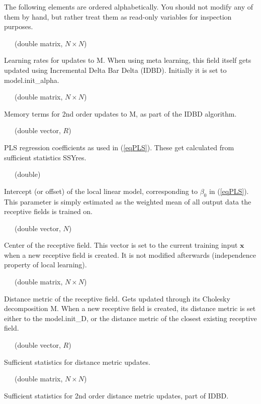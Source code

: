 \documentclass[11pt,a4paper]{article}
\newcommand{\mbf}{\mathbf}
\newenvironment{element}[2]%
{{\large\sf #1}~~~(#2)\begin{list}{}%
{\setlength{\leftmargin}{0.5cm}\setlength{\topsep}{0.2cm}}%
\item[]%
}
{\end{list}}
\begin{document}
The following elements are ordered alphabetically. You should not
modify any of them by hand, but rather treat them as read-only variables
for inspection purposes.\medskip

\begin{element}{alpha}{double matrix, $N\times N$}
Learning rates for
updates to {\sf M}. When using meta learning, this field itself
gets updated using Incremental Delta Bar Delta (IDBD). Initially it 
is set to {\sf model.init\_alpha}.
\end{element}

\begin{element}{b}{double matrix, $N\times N$}
Memory terms for 2nd 
order updates to {\sf M}, as part of the IDBD algorithm.
\end{element}

\begin{element}{beta}{double vector, $R$}
PLS regression coefficients
as used in (\ref{eqPLS}). These get calculated from sufficient
statistics {\sf SSYres}.
\end{element}

\begin{element}{beta\_0}{double}
Intercept (or offset) of the local linear
model, corresponding to $\beta_0$ in (\ref{eqPLS}). This parameter
is simply estimated as the weighted mean of all output data the
receptive fields is trained on.
\end{element}

\begin{element}{c}{double vector, $N$}
Center of the receptive field.
This vector is set to the current training input $\mbf x$ when
a new receptive field is created. It is not modified afterwards
(independence property of local learning).
\end{element}

\begin{element}{D}{double matrix, $N\times N$}
Distance metric of the
receptive field. Gets updated through its Cholesky decomposition
{\sf M}. When a new receptive field is created, its distance metric
is set either to the {\sf model.init\_D}, or the distance metric
of the closest existing receptive field.
\end{element}

\begin{element}{H}{double vector, $R$}
Sufficient statistics for distance metric updates.
\end{element}

\begin{element}{h}{double matrix, $N\times N$}
Sufficient statistics for 2nd order distance metric updates,
part of IDBD.
\end{element}
\end{document}

